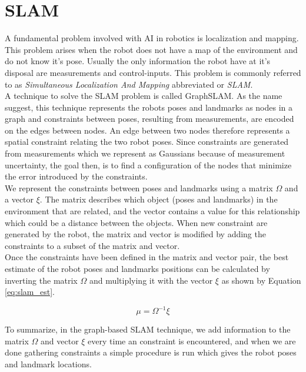 
\section{SLAM}

A fundamental problem involved with AI in robotics is localization and mapping. This problem arises when the robot does not have a map of the environment and do not know it's pose. Usually the only information the robot have at it's disposal are measurements and control-inputs. This problem is commonly referred to as \textit{Simultaneous Localization And Mapping} abbreviated or \textit{SLAM}.\\

A technique to solve the SLAM problem is called GraphSLAM. As the name suggest, this technique represents the robots poses and landmarks as nodes in a graph and constraints between poses, resulting from measurements, are encoded on the edges between nodes. An edge between two nodes therefore represents a spatial constraint relating the two robot poses. Since constraints are generated from measurements which we represent as Gaussians because of measurement uncertainty, the goal then, is to find a configuration of the nodes that minimize the error introduced by the constraints.\\

We represent the constraints between poses and landmarks using a matrix $\Omega$ and a vector $\xi$. The matrix describes which object (poses and landmarks) in the environment that are related, and the vector contains a value for this relationship which could be a distance between the objects. When new constraint are generated by the robot, the matrix and vector is modified by adding the constraints to a subset of the matrix and vector.\\

Once the constraints have been defined in the matrix and vector pair, the best estimate of the robot poses and landmarks positions can be calculated by inverting the matrix $\Omega$ and multiplying it with the vector $\xi$ as shown by Equation \ref{eq:slam_est}.

\begin{equation}
\label{eq:slam_est}
\mu = \Omega^{-1}\xi
\end{equation}

To summarize, in the graph-based SLAM technique, we add information to the matrix $\Omega$ and vector $\xi$ every time an constraint is encountered, and when we are done gathering constraints a simple procedure is run which gives the robot poses and landmark locations.

